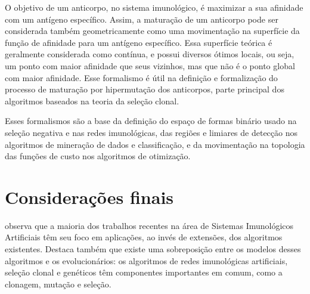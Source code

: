 O objetivo de um anticorpo, no sistema imunológico, é maximizar a sua afinidade com um antígeno específico. Assim, a maturação de um anticorpo pode ser considerada também geometricamente como uma movimentação na superfície da função de afinidade para um antígeno específico. Essa superfície teórica é geralmente considerada como contínua, e possui diversos ótimos locais, ou seja, um ponto com maior afinidade que seus vizinhos, mas que não é o ponto global com maior afinidade. Esse formalismo é útil na definição e formalização do processo de maturação por hipermutação dos anticorpos, parte principal dos algoritmos baseados na teoria da seleção clonal.

Esses formalismos são a base da definição do espaço de formas binário usado na seleção negativa e nas redes imunológicas, das regiões e limiares de detecção nos algoritmos de mineração de dados e classificação, e da movimentação na topologia das funções de custo nos algoritmos de otimização.

\section{Considerações finais}

\citet{Dasgupta2010} observa que a maioria dos trabalhos recentes na área de Sistemas Imunológicos Artificiais têm seu foco em aplicações, ao invés de extensões, dos algoritmos existentes. Destaca também que existe uma sobreposição entre os modelos desses algoritmos e os evolucionários: os algoritmos de redes imunológicas artificiais, seleção clonal e genéticos têm componentes importantes em comum, como a clonagem, mutação e seleção.
